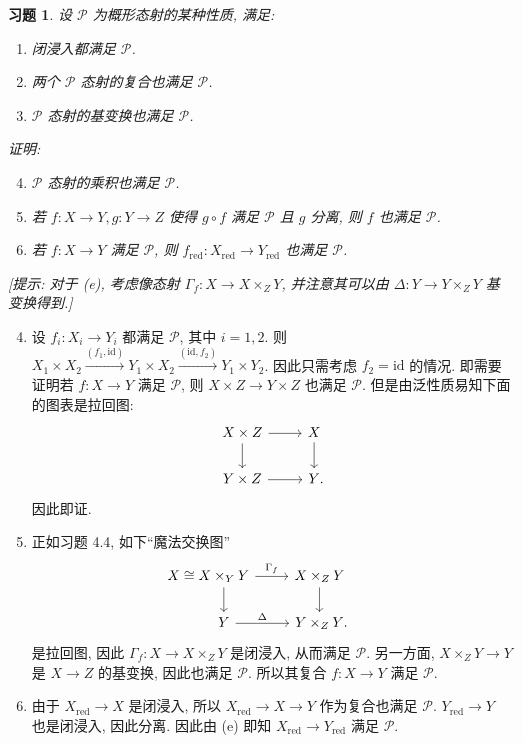 \documentclass{article}
\theoremstyle{exercise}
\newtheorem{exercise}{习题}[section]
\theoremstyle{plain}
\theoremstyle{remark}
\newenvironment{proofc}{\proof}{\endproof}
\def\id{\mathrm{id}}
\def\red{\mathrm{red}}
\begin{document}
\begin{exercise}
  \def\PP{\mathscr{P}}
  设 $\PP$ 为概形态射的某种性质, 满足:
  \begin{enumerate}[label=(\alph*)]
    \item 闭浸入都满足 $\PP$.
    \item 两个 $\PP$ 态射的复合也满足 $\PP$.
    \item $\PP$ 态射的基变换也满足 $\PP$.
  \end{enumerate}
  证明:
  \begin{enumerate}[label=(\alph*)]
          \setcounter{enumi}{3}
    \item $\PP$ 态射的乘积也满足 $\PP$.
    \item 若 $f \colon X \to Y, g \colon Y \to Z$ 使得 $g \circ f$ 满足 $\PP$
          且 $g$ 分离, 则 $f$ 也满足 $\PP$.
    \item 若 $f \colon X \to Y$ 满足 $\PP$,
          则 $f_{\red} \colon X_{\red} \to Y_{\red}$ 也满足 $\PP$.
  \end{enumerate}
  [\emph{提示: 对于 (e), 考虑像态射 $\Gamma_f \colon X \to X \times_Z Y$,
    并注意其可以由 $\Delta \colon Y \to Y \times_Z Y$ 基变换得到.}]
\end{exercise}

\begin{proofc}
  \def\PP{\mathscr{P}}
  \begin{enumerate}[label=(\alph*)]
          \setcounter{enumi}{3}
    \item 设 $f_i \colon X_i \to Y_i$ 都满足 $\PP$, 其中 $i = 1, 2$.
          则 $X_1 \times X_2 \xrightarrow{(f_1, \id)} Y_1 \times X_2
          \xrightarrow{(\id, f_2)} Y_1 \times Y_2$.
          因此只需考虑 $f_2 = \id$ 的情况.
          即需要证明若 $f \colon X \to Y$ 满足 $\PP$,
          则 $X \times Z \to Y \times Z$ 也满足 $\PP$.
          但是由泛性质易知下面的图表是拉回图:
          \[\begin{tikzcd}
              X \times Z \ar[r] \ar[d] & X \ar[d] \\
              Y \times Z \ar[r] & Y\rlap{.}
            \end{tikzcd}\]
          因此即证.
    \item 正如习题 4.4, 如下``魔法交换图''
          \[\begin{tikzcd}
              \llap{$X \cong {}$} X \times_Y Y \ar[r, "\Gamma_f"] \ar[d] & X \times_Z Y \ar[d] \\
              Y \ar[r, "\Delta"] & Y \times_Z Y\rlap{.}
            \end{tikzcd}\]
          是拉回图, 因此 $\Gamma_f \colon X \to X \times_Z Y$ 是闭浸入, 从而满足 $\PP$.
          另一方面, $X \times_Z Y \to Y$ 是 $X \to Z$ 的基变换, 因此也满足 $\PP$.
          所以其复合 $f \colon X \to Y$ 满足 $\PP$.
    \item 由于 $X_{\red} \to X$ 是闭浸入, 所以 $X_{\red} \to X \to Y$ 作为复合也满足 $\PP$.
          $Y_{\red} \to Y$ 也是闭浸入, 因此分离.
          因此由 (e) 即知 $X_{\red} \to Y_{\red}$ 满足 $\PP$. \qedhere
  \end{enumerate}
\end{proofc}
\end{document}

